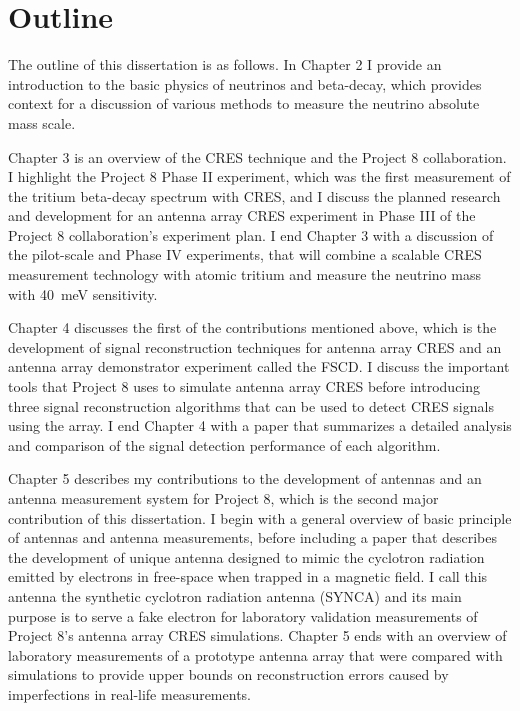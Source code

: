 \section{Outline}

The outline of this dissertation is as follows. In Chapter 2 I provide an introduction to the basic physics of neutrinos and beta-decay, which provides context for a discussion of various methods to measure the neutrino absolute mass scale. 

Chapter 3 is an overview of the CRES technique and the Project 8 collaboration. I highlight the Project 8 Phase II experiment, which was the first measurement of the tritium beta-decay spectrum with CRES, and I discuss the planned research and development for an antenna array CRES experiment in Phase III of the Project 8 collaboration's experiment plan. I end Chapter 3 with a discussion of the pilot-scale and Phase IV experiments, that will combine a scalable CRES measurement technology with atomic tritium and measure the neutrino mass with 40~meV sensitivity.

Chapter 4 discusses the first of the contributions mentioned above, which is the development of signal reconstruction techniques for antenna array CRES and an antenna array demonstrator experiment called the FSCD. I discuss the important tools that Project 8 uses to simulate antenna array CRES before introducing three signal reconstruction algorithms that can be used to detect CRES signals using the array. I end Chapter 4 with a paper that summarizes a detailed analysis and comparison of the signal detection performance of each algorithm.

Chapter 5 describes my contributions to the development of antennas and an antenna measurement system for Project 8, which is the second major contribution of this dissertation. I begin with a general overview of basic principle of antennas and antenna measurements, before including a paper that describes the development of unique antenna designed to mimic the cyclotron radiation emitted by electrons in free-space when trapped in a magnetic field. I call this antenna the synthetic cyclotron radiation antenna (SYNCA) and its main purpose is to serve a fake electron for laboratory validation measurements of Project 8's antenna array CRES simulations. Chapter 5 ends with an overview of laboratory measurements of a prototype antenna array that were compared with simulations to provide upper bounds on reconstruction errors caused by imperfections in real-life measurements.

